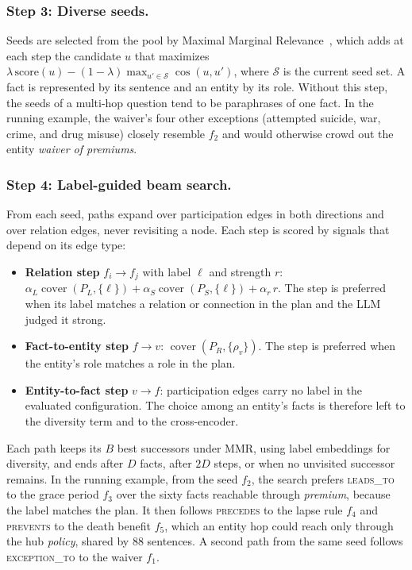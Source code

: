 \documentclass[sigconf, review, anonymous]{acmart}
\newcommand{\rel}[1]{\textsc{#1}}            %
\newcommand{\simcos}{\operatorname{cos}}
\newcommand{\cover}{\operatorname{cover}}
\begin{document}
\subsubsection*{Step 3: Diverse seeds.}
Seeds are selected from the pool by Maximal Marginal Relevance~\cite{carbonell1998use}, which adds at each step the candidate $u$ that maximizes
$\lambda\, \mathrm{score}(u) - (1 - \lambda) \max_{u' \in \mathcal{S}} \simcos(u, u')$,
where $\mathcal{S}$ is the current seed set. A fact is represented by its sentence and an entity by its role. Without this step, the seeds of a multi-hop question tend to be paraphrases of one fact. In the running example, the waiver's four other exceptions (attempted suicide, war, crime, and drug misuse) closely resemble $f_2$ and would otherwise crowd out the entity \emph{waiver of premiums}.

\subsubsection*{Step 4: Label-guided beam search.}
From each seed, paths expand over participation edges in both directions and over relation edges, never revisiting a node. Each step is scored by signals that depend on its edge type:
\begin{itemize}
  \item \textbf{Relation step} $f_i \to f_j$ with label $\ell$ and strength $r$: $\alpha_L \cover(P_L, \{\ell\}) + \alpha_S \cover(P_S, \{\ell\}) + \alpha_r\, r$. The step is preferred when its label matches a relation or connection in the plan and the LLM judged it strong.
  \item \textbf{Fact-to-entity step} $f \to v$: $\cover(P_R, \{\rho_v\})$. The step is preferred when the entity's role matches a role in the plan.
  \item \textbf{Entity-to-fact step} $v \to f$: participation edges carry no label in the evaluated configuration. The choice among an entity's facts is therefore left to the diversity term and to the cross-encoder.
\end{itemize}
Each path keeps its $B$ best successors under MMR, using label embeddings for diversity, and ends after $D$ facts, after $2D$ steps, or when no unvisited successor remains. In the running example, from the seed $f_2$, the search prefers \rel{leads\_to} to the grace period $f_3$ over the sixty facts reachable through \emph{premium}, because the label matches the plan. It then follows \rel{precedes} to the lapse rule $f_4$ and \rel{prevents} to the death benefit $f_5$, which an entity hop could reach only through the hub \emph{policy}, shared by 88 sentences. A second path from the same seed follows \rel{exception\_to} to the waiver $f_1$.
\end{document}
